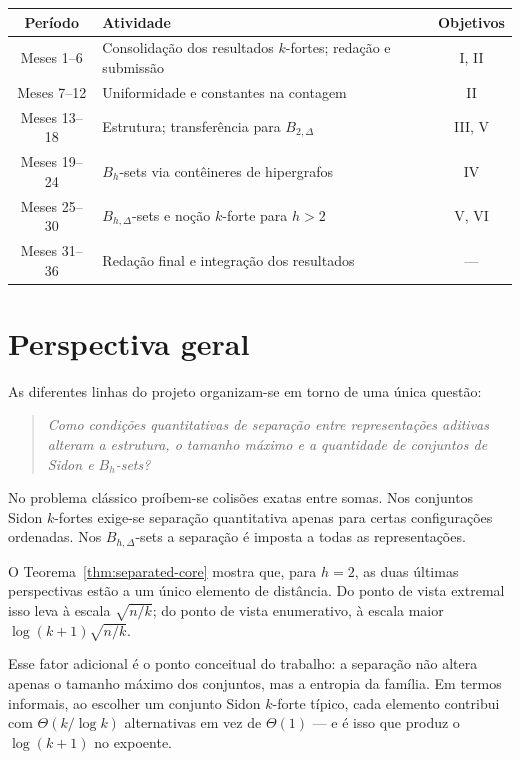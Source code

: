 \documentclass[11pt,a4paper]{article}
\theoremstyle{definition}
\theoremstyle{remark}
\begin{document}
\begin{center}
  \renewcommand{\arraystretch}{1.4}
  \begin{tabular}{clc}
    \hline
    \textbf{Período}    & \textbf{Atividade}                             & \textbf{Objetivos} \\
    \hline
    Meses 1--6          & Consolidação dos resultados \(k\)-fortes;
    redação e submissão & I, II                                                               \\
    Meses 7--12         & Uniformidade e constantes na contagem          & II                 \\
    Meses 13--18        & Estrutura; transferência para \(B_{2,\Delta}\)
                        & III, V                                                              \\
    Meses 19--24        & \(B_h\)-sets via contêineres de hipergrafos    & IV                 \\
    Meses 25--30        & \(B_{h,\Delta}\)-sets e noção \(k\)-forte para
    \(h>2\)             & V, VI                                                               \\
    Meses 31--36        & Redação final e integração dos resultados      & ---                \\
    \hline
  \end{tabular}
\end{center}

\section{Perspectiva geral}

As diferentes linhas do projeto organizam-se em torno de uma única
questão:

\begin{quote}
  \emph{Como condições quantitativas de separação entre representações
    aditivas alteram a estrutura, o tamanho máximo e a quantidade de
    conjuntos de Sidon e \(B_h\)-sets?}
\end{quote}

No problema clássico proíbem-se colisões exatas entre somas. Nos
conjuntos Sidon \(k\)-fortes exige-se separação quantitativa apenas para
certas configurações ordenadas. Nos \(B_{h,\Delta}\)-sets a separação é
imposta a todas as representações.

O Teorema~\ref{thm:separated-core} mostra que, para \(h=2\), as duas
últimas perspectivas estão a um único elemento de distância. Do ponto de
vista extremal isso leva à escala \(\sqrt{n/k}\); do ponto de vista
enumerativo, à escala maior \(\log(k+1)\sqrt{n/k}\).

Esse fator adicional é o ponto conceitual do trabalho: a separação não
altera apenas o tamanho máximo dos conjuntos, mas a entropia da família.
Em termos informais, ao escolher um conjunto Sidon \(k\)-forte típico,
cada elemento contribui com \(\Theta(k/\log k)\) alternativas em vez de
\(\Theta(1)\) --- e é isso que produz o \(\log(k+1)\) no expoente.




\end{document}
